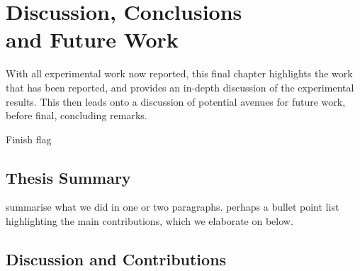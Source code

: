 
\chapter[Discussion, Conclusions and Future Work]{Discussion, Conclusions\\and Future Work}\label{chap:conclusions}
With all experimental work now reported, this final chapter highlights the work that has been reported, and provides an in-depth discussion of the experimental results. This then leads onto a discussion of potential avenues for future work, before final, concluding remarks.

Finish flag

\section{Thesis Summary}

summarise what we did in one or two paragraphs. perhaps a bullet point list highlighting the main contributions, which we elaborate on below.


\section{Discussion and Contributions}

